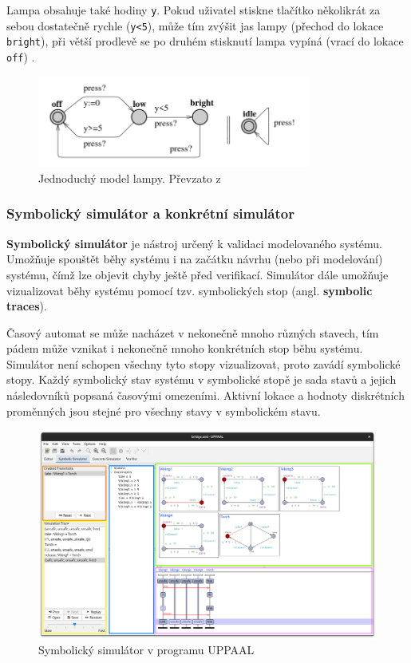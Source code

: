 Lampa obsahuje také hodiny \texttt{y}. Pokud uživatel stiskne tlačítko několikrát za sebou dostatečně rychle (\texttt{y<5}), může tím zvýšit jas lampy (přechod do lokace \texttt{bright}), při větší prodlevě se po druhém stisknutí lampa vypíná (vrací do lokace \texttt{off}) \cite{uppaal_intro}.

\begin{figure}[H]
    \centering
    \includegraphics[width=0.8\textwidth]{obrazky-figures/lamp_model.png}
    \caption{Jednoduchý model lampy. Převzato z \cite{uppaal_intro}}
    \label{fig:lamp}
\end{figure}

\subsubsection{Symbolický simulátor a konkrétní simulátor}
\textbf{Symbolický simulátor} je nástroj určený k validaci modelovaného systému. Umožňuje spouštět běhy systému i na začátku návrhu (nebo při modelování) systému, čímž lze objevit chyby ještě před verifikací. Simulátor dále umožňuje vizualizovat běhy systému pomocí tzv. symbolických stop (angl. \textbf{symbolic traces}).

Časový automat se může nacházet v nekonečně mnoho různých stavech, tím pádem může vznikat i nekonečně mnoho konkrétních stop běhu systému. Simulátor není schopen všechny tyto stopy vizualizovat, proto zavádí symbolické stopy. Každý symbolický stav systému v symbolické stopě je sada stavů a jejich následovníků popsaná časovými omezeními. Aktivní lokace a hodnoty diskrétních proměnných jsou stejné pro všechny stavy v symbolickém stavu.

\begin{figure}[H]
    \centering
    \includegraphics[width=\textwidth]{obrazky-figures/uppaal_symbsim.png}
    \caption{Symbolický simulátor v programu UPPAAL}
    \label{fig:uppaal_symbsim}
\end{figure}

